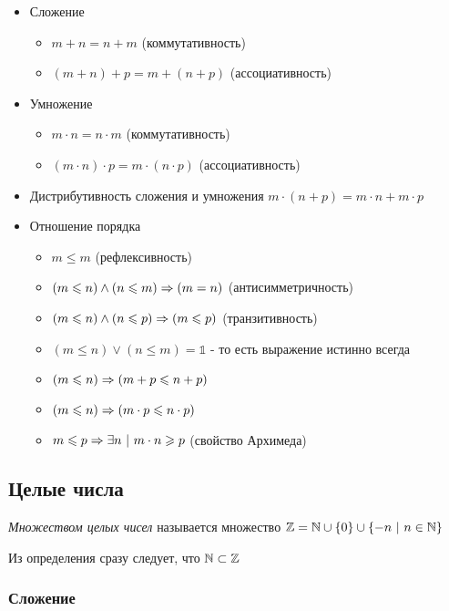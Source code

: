 \begin{itemize}
    \item Сложение
    \begin{itemize}
        \item $m + n = n + m$ (коммутативность)
        \item $(m + n) + p = m + (n + p)$ (ассоциативность)
    \end{itemize}
    \item Умножение
    \begin{itemize}
        \item $m \cdot n = n \cdot m$ (коммутативность)
        \item $(m \cdot n) \cdot p = m \cdot (n \cdot p)$ (ассоциативность)
    \end{itemize}
    \item Дистрибутивность сложения и умножения
    $m \cdot (n + p) = m \cdot n + m \cdot p$
    \item Отношение порядка
    \begin{itemize}
        \item $m \le m$ (рефлексивность)
        \item $(m \leqslant n) \wedge (n \leqslant m) \Rightarrow (m = n)$ (антисимметричность)
        \item $(m \leqslant n) \wedge (n \leqslant p) \Rightarrow (m \leqslant p)$ (транзитивность)
        \item $(m \le n) \vee (n \le m) = \mathbb{1}$ - то есть выражение истинно всегда
        \item $(m \leqslant n) \Rightarrow (m + p \leqslant n + p)$
        \item $(m \leqslant n) \Rightarrow (m \cdot p \leqslant n \cdot p)$
        \item $m \leqslant p \Rightarrow \exists n\ |\ m \cdot n \geqslant p$ (свойство Архимеда)
    \end{itemize}
\end{itemize}


\subsection{Целые числа}

\begin{definition}
    \textit{Множеством целых чисел} называется множество $\mathbb{Z} = \mathbb{N} \cup \{0\} \cup \{-n\ |\ n \in \mathbb{N}\}$
\end{definition}

Из определения сразу следует, что $\mathbb{N} \subset \mathbb{Z}$

\subsubsection{Сложение}


